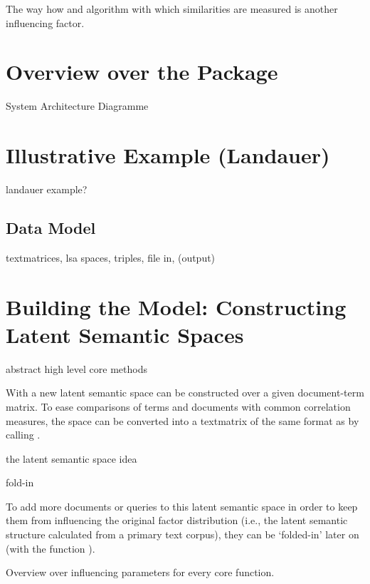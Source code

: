 \documentclass[article]{jss}
\begin{document}
The way how and algorithm with which similarities are measured is another
influencing factor.

\section{Overview over the Package}

System Architecture Diagramme

\section{Illustrative Example (Landauer)}

landauer example?

\subsection{Data Model}

textmatrices, lsa spaces, triples, file in, (output)

\section{Building the Model: Constructing Latent Semantic Spaces}

abstract high level core methods

With  a new latent semantic space can
be constructed over a given document-term matrix. To ease
comparisons of terms and documents with common
correlation measures, the space can be converted into
a textmatrix of the same format as  
by calling .

the latent semantic space idea

fold-in

To add more documents or queries to this latent semantic
space in order to keep them from influencing the original 
factor distribution (i.e., the latent semantic structure calculated
from a primary text corpus), they can be `folded-in' later on 
(with the function ).

Overview over influencing parameters for every core function.
\end{document}
